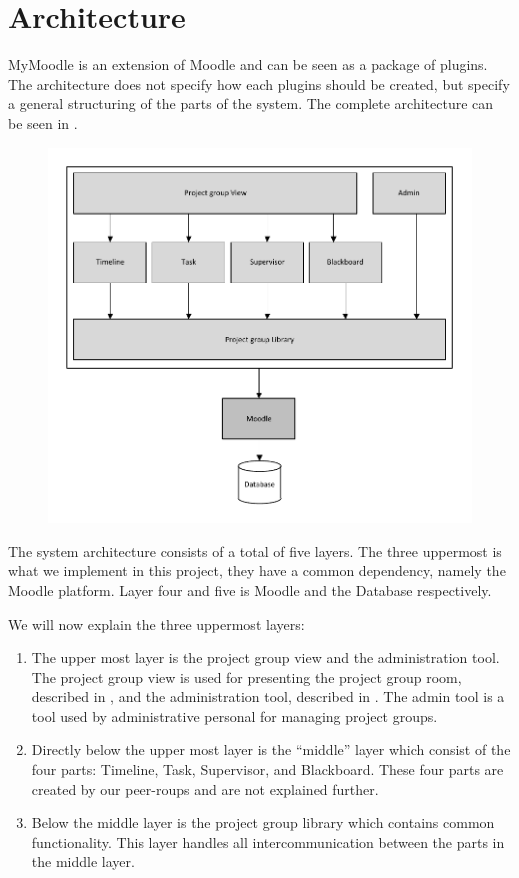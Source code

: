 \section{Architecture}
MyMoodle is an extension of Moodle and can be seen as a package of plugins. 
The architecture does not specify how each plugins should be created, but specify a general structuring of the parts of the system. 
The complete architecture can be seen in .
\begin{figure}
	\centering
		\includegraphics{images/architecture.pdf}
	\label{fig:architecture}
\end{figure}

The system architecture consists of a total of five layers. 
The three uppermost is what we implement in this project, they have a common dependency, namely the Moodle platform. 
Layer four and five is Moodle and the Database respectively.

We will now explain the three uppermost layers:
\begin{enumerate}
	\item The upper most layer is the project group view and the administration tool. The project group view is used for presenting the project group room, described in , and the administration tool, described in . The admin tool is a tool used by administrative personal for managing project groups.
	\item Directly below the upper most layer is the ``middle'' layer which consist of the four parts: Timeline, Task, Supervisor, and Blackboard. These four parts are created by our peer-roups and are not explained further.
	\item Below the middle layer is the project group library which contains common functionality. This layer handles all intercommunication between the parts in the middle layer.  
\end{enumerate}


